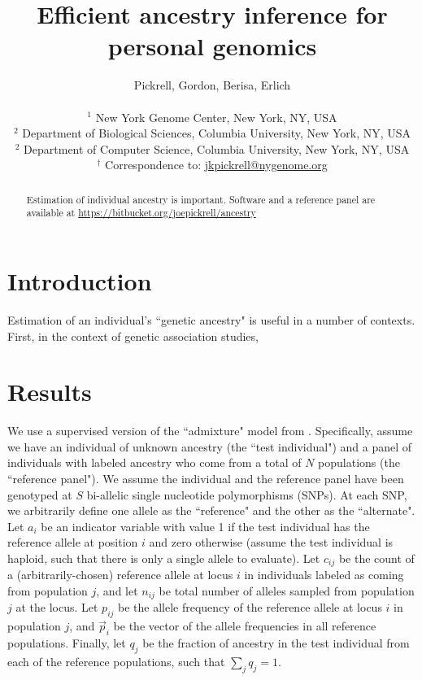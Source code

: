 \documentclass[11pt,titlepage]{article}
\begin{document}
\title{Efficient ancestry inference for personal genomics}
\author{Pickrell, Gordon, Berisa, Erlich\\ \\
\small $^1$ New York Genome Center, New York, NY, USA\\
\small $^2$ Department of Biological Sciences, Columbia University, New York, NY, USA \\
\small $^2$ Department of Computer Science, Columbia University, New York, NY, USA \\
\small $^\dagger$ Correspondence to: \url{jkpickrell@nygenome.org}
}
\maketitle
\begin{abstract}
Estimation of individual ancestry is important. Software and a reference panel are available at \url{https://bitbucket.org/joepickrell/ancestry}
\end{abstract}
\clearpage
\section{Introduction}
Estimation of an individual's ``genetic ancestry" is useful in a number of contexts. First, in the context of genetic association studies, 

\section{Results}
We use a supervised version of the ``admixture" model from \citet{Pritchard:2000zr}. Specifically, assume we have an individual of unknown ancestry (the ``test individual") and a panel of individuals with labeled ancestry who come from a total of $N$ populations (the ``reference panel"). We assume the individual and the reference panel have been genotyped at $S$ bi-allelic single nucleotide polymorphisms (SNPs). At each SNP, we arbitrarily define one allele as the ``reference" and the other as the ``alternate". Let $a_i$ be an indicator variable with value 1 if the test individual has the reference allele at position $i$ and zero otherwise (assume the test individual is haploid, such that there is only a single allele to evaluate). Let $c_{ij}$ be the count of a (arbitrarily-chosen) reference allele at locus $i$ in individuals labeled as coming from population $j$, and let $n_{ij}$ be total number of alleles sampled from population $j$ at the locus. Let $p_{ij}$ be the allele frequency of the reference allele at locus $i$ in population $j$, and $\vec p_i$ be the vector of the allele frequencies in all reference populations. Finally, let $q_j$ be the fraction of ancestry in the test individual from each of the reference populations, such that $\sum_j q_j = 1$. 
\end{document}
